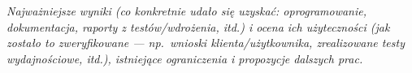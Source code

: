 \documentclass[polish,12pt]{aghthesis}
\begin{document}
\label{sec:wyniki-projektu}

\emph{Najważniejsze wyniki (co konkretnie udało się uzyskać:
  oprogramowanie, dokumentacja, raporty z testów/wdrożenia, itd.)
  i ocena ich użyteczności (jak zostało to zweryfikowane --- np.\ wnioski
  klienta/użytkownika, zrealizowane testy wydajnościowe, itd.),
  istniejące ograniczenia i propozycje dalszych prac.}


\nocite{artykul2011,ksiazka2011,narzedzie2011,projekt2011}


\end{document}

